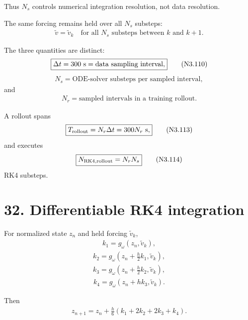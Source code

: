 \documentclass[11pt]{article}
\begin{document}
Thus \(N_s\) controls numerical integration resolution, not data resolution.

The same forcing remains held over all \(N_s\) substeps:
\begin{align}
\boxed{
\widetilde v=\widetilde v_k
\quad
\text{for all }N_s\text{ substeps between }k\text{ and }k+1.
}
\tag{N3.109}
\end{align}

The three quantities are distinct:
\begin{align}
\boxed{
\Delta t=300\ {\rm s}=\text{data sampling interval},
}
\tag{N3.110}
\end{align}
\begin{align}
\boxed{
N_s=\text{ODE-solver substeps per sampled interval},
}
\tag{N3.111}
\end{align}
and
\begin{align}
\boxed{
N_r=\text{sampled intervals in a training rollout}.
}
\tag{N3.112}
\end{align}

A rollout spans
\begin{align}
\boxed{
T_{\rm rollout}=N_r\Delta t=300N_r\ {\rm s},
}
\tag{N3.113}
\end{align}
and executes
\begin{align}
\boxed{
N_{\rm RK4,rollout}=N_rN_s
}
\tag{N3.114}
\end{align}
RK4 substeps.

\section*{32. Differentiable RK4 integration}

For normalized state \(z_n\) and held forcing \(\widetilde v_k\),
\begin{align}
\boxed{
k_1=g_\omega(z_n,\widetilde v_k),
}
\tag{N3.115}
\end{align}
\begin{align}
\boxed{
k_2=
g_\omega\left(z_n+\frac{h}{2}k_1,\widetilde v_k\right),
}
\tag{N3.116}
\end{align}
\begin{align}
\boxed{
k_3=
g_\omega\left(z_n+\frac{h}{2}k_2,\widetilde v_k\right),
}
\tag{N3.117}
\end{align}
\begin{align}
\boxed{
k_4=
g_\omega\left(z_n+hk_3,\widetilde v_k\right).
}
\tag{N3.118}
\end{align}

Then
\begin{align}
\boxed{
z_{n+1}
=
z_n+\frac{h}{6}(k_1+2k_2+2k_3+k_4).
}
\tag{N3.119}
\end{align}
\end{document}
